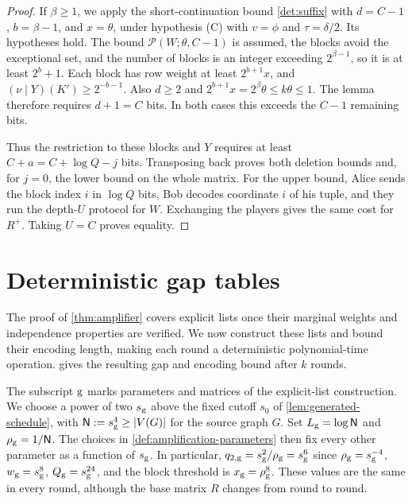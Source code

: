 \documentclass[11pt,letterpaper]{article} \usepackage[utf8]{inputenc}
\theoremstyle{plain} \newtheorem{theorem}{Theorem}[section]
\theoremstyle{definition} \newaliascnt{definition}{theorem}
\newcommand{\RP}[3]{\mathcal{P}(#1;#2,#3)}
\begin{document}
\begin{proof}
If $\beta\ge1$, we apply the short-continuation bound \cref{det:suffix} with
$d=C-1$, $b=\beta-1$, and $x=\theta$, under hypothesis (C) with $v=\phi$ and $\tau=\delta/2$.
Its hypotheses hold. The bound $\RP{W}{\theta}{C-1}$ is assumed, the blocks avoid the exceptional set,
and the number of blocks is an integer exceeding
$2^{\beta-1}$, so it is at least $2^b+1$. Each block has row
weight at least $2^{b+1}x$, and $(\nu\mid Y)(K')\ge2^{-b-1}$. Also $d\ge2$ and
$2^{b+1}x=2^\beta\theta\le k\theta\le1$. The lemma therefore requires $d+1=C$ bits.
In both cases this exceeds the $C-1$ remaining bits.

Thus the restriction to these blocks and $Y$ requires at least $C+a=C+\log Q-j$ bits. Transposing
back proves both deletion bounds and, for $j=0$, the lower bound on the whole matrix. For the
upper bound, Alice sends the block index $i$ in $\log Q$ bits, Bob decodes coordinate $i$ of his tuple,
and they run the depth-$U$ protocol for $W$. Exchanging the players gives the
same cost for $R^+$. Taking $U=C$ proves equality.
\end{proof}

\section{Deterministic gap tables}\label{sec:deterministic}
\label{sec:deterministic_amplification}

The proof of \cref{thm:amplifier} covers explicit lists once their
marginal weights and independence properties are verified. We now construct
these lists and bound their encoding length, making each round a deterministic
polynomial-time operation.  gives the resulting gap and
encoding bound after \(k\) rounds.

The subscript $\rm g$ marks parameters and matrices of the explicit-list
construction. We choose a
power of two $s_{\rm g}$ above the fixed cutoff $s_0$ of
\cref{lem:generated-schedule}, with $\mathsf N:=s_{\rm g}^4\ge|V(G)|$ for the
source graph $G$.
Set $L_{\rm g}=\log\mathsf N$ and $\rho_{\rm g}=1/\mathsf N$. The choices in
\cref{def:amplification-parameters} then fix every other parameter as a
function of $s_{\rm g}$. In particular, $q_{2,\rm g}=s_{\rm g}^2/\rho_{\rm g}=s_{\rm g}^6$ since $\rho_{\rm g}=s_{\rm g}^{-4}$,
$w_{\rm g}=s_{\rm g}^8$, $Q_{\rm g}=s_{\rm g}^{24}$, and the block threshold is
$x_{\rm g}=\rho_{\rm g}^8$. These values are the same in every round, although the base
matrix $R$ changes from round to round.
\end{document}

